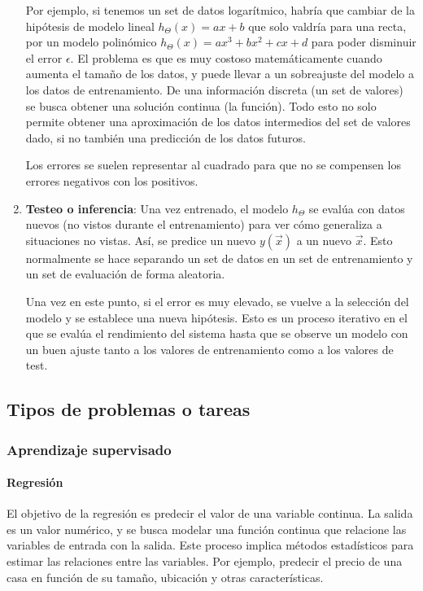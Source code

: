 \begin{enumerate}
Por ejemplo, si tenemos un set de datos logarítmico, habría que cambiar de la hipótesis de modelo lineal $h_{\Theta}(x) = ax + b$ que solo valdría para una recta, por un modelo polinómico $h_{\Theta}(x) = ax^3 + bx^2 + cx + d$ para poder disminuir el error $\epsilon$. El problema es que es muy costoso matemáticamente cuando aumenta el tamaño de los datos, y puede llevar a un sobreajuste del modelo a los datos de entrenamiento. De una información discreta (un set de valores) se busca obtener una solución continua (la función). Todo esto no solo permite obtener una aproximación de los datos intermedios del set de valores dado, si no también una predicción de los datos futuros.

Los errores se suelen representar al cuadrado para que no se compensen los errores negativos con los positivos. 

\item \textbf{Testeo o inferencia}: Una vez entrenado, el modelo $h_{\Theta}$ se evalúa con datos nuevos (no vistos durante el entrenamiento) para ver cómo generaliza a situaciones no vistas. Así, se predice un nuevo $y(\vec{x})$ a un nuevo $\vec{x}$. Esto normalmente se hace separando un set de datos en un set de entrenamiento y un set de evaluación de forma aleatoria. 

Una vez en este punto, si el error es muy elevado, se vuelve a la selección del modelo y se establece una nueva hipótesis. Esto es un proceso iterativo en el que se evalúa el rendimiento del sistema hasta que se observe un modelo con un buen ajuste tanto a los valores de entrenamiento como a los valores de test.
\end{enumerate}

\subsection{Tipos de problemas o tareas}
\subsubsection{Aprendizaje supervisado}
\paragraph{Regresión} El objetivo de la regresión es predecir el valor de una variable continua. La salida es un valor numérico, y se busca modelar una función continua que relacione las variables de entrada con la salida. Este proceso implica métodos estadísticos para estimar las relaciones entre las variables. Por ejemplo, predecir el precio de una casa en función de su tamaño, ubicación y otras características.

